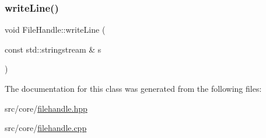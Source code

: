 \mbox{\label{classFileHandle_ab29b54653be4f74651163760f8edd395}} 
\subsubsection{\texorpdfstring{writeLine()}{writeLine()}\hspace{0.1cm}{\footnotesize\ttfamily [2/2]}}
{\footnotesize\ttfamily void File\+Handle\+::write\+Line (\begin{DoxyParamCaption}\item[{const std\+::stringstream \&}]{s }\end{DoxyParamCaption})}



The documentation for this class was generated from the following files\+:\begin{DoxyCompactItemize}
\item 
src/core/\mbox{\hyperlink{filehandle_8hpp}{filehandle.\+hpp}}\item 
src/core/\mbox{\hyperlink{filehandle_8cpp}{filehandle.\+cpp}}\end{DoxyCompactItemize}
